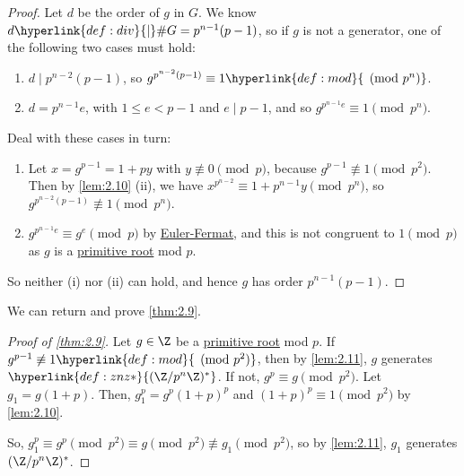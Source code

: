 \documentclass{article}
\begin{document}
\begin{proof}
    Let $d$ be the order of $g$ in $G$.
    We know $d \hyperlink{def:div}{\mid} \#G = p^{n-1}(p-1)$, so if $g$ is not a generator, one of the following two cases must hold:

    \begin{enumerate}[label=(\roman*)]
        \item $d \mid p^{n-2} (p-1)$, so $g^{p^{n-2}(p-1)} \equiv 1 \hyperlink{def:mod}{\pmod{p^n}}$.
        \item $d = p^{n-1} e$, with $1 \leq e < p-1$ and $e \mid p-1$, and so $g^{p^{n-1} e} \equiv 1 \pmod{p^n}$.
    \end{enumerate}
    Deal with these cases in turn:

    \begin{enumerate}[label=(\roman*)]
        \item Let $x = g^{p-1} = 1+py$ with $y \not\equiv 0 \pmod{p}$, because $g^{p-1} \not\equiv 1 \pmod{p^2}$.
            Then by \cref{lem:2.10} (ii), we have $x^{p^{n-2}} \equiv 1 + p^{n-1} y \pmod{p^n}$, so $g^{p^{n-2}(p-1)} \not\equiv 1 \pmod{p^n}$.

        \item $g^{p^{n-1}e} \equiv g^e \pmod{p}$ by \hyperlink{thm:eulerFermat}{Euler-Fermat}, and this is not congruent to $1 \pmod{p}$ as $g$ is a \hyperlink{def:primRoot}{primitive root} mod $p$.
    \end{enumerate}

    So neither (i) nor (ii) can hold, and hence $g$ has order $p^{n-1}(p-1)$.
\end{proof}

We can return and prove \cref{thm:2.9}.

\begin{proof}[Proof of \cref{thm:2.9}]\label{pf:2.9}
    Let $g \in \Z$ be a \hyperlink{def:primRoot}{primitive root} mod $p$.
    If $g^{p-1} \not\equiv 1 \hyperlink{def:mod}{\pmod{p^2}}$, then by \cref{lem:2.11}, $g$ generates $\hyperlink{def:znz*}{(\Z/p^n \Z)^*}$.
    If not, $g^p \equiv g \pmod{p^2}$. Let $g_1 = g(1 + p)$.
    Then, $g_1^p = g^p (1+p)^p$ and $(1+p)^p \equiv 1 \pmod{p^2}$ by \cref{lem:2.10}.

    So, $g_1^p \equiv g^p \pmod{p^2} \equiv g \pmod{p^2} \not\equiv g_1 \pmod{p^2}$, so by \cref{lem:2.11}, $g_1$ generates $(\Z/p^n \Z)^*$.
\end{proof}
\end{document}
